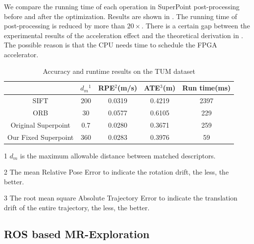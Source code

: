 We compare the running time of each operation in SuperPoint post-processing before and after the optimization. Results are shown in . The running time of post-processing is reduced by more than $20\times$. There is a certain gap between the experimental results of the acceleration effect and the theoretical derivation in . The possible reason is that the CPU needs time to schedule the FPGA accelerator.

\begin{table}[t]
  \centering
  \setlength{\abovecaptionskip}{2pt} 
  \caption{ Accuracy and runtime results on the TUM\cite{sturm12iros} dataset  }
  \footnotesize
  \begin{threeparttable}
\begin{tabular}{|c|c|c|c|c|} 
  \hline
        & $d_m$$^1$ & RPE$^2$(m/s) & ATE$^3$(m)  & Run time(ms) \bigstrut\\
  \hline
  SIFT \cite{Lowe-478}  & 200   & 0.0319  & 0.4219 & 2397  \bigstrut\\
  \hline
  ORB \cite{Mur-Artal:2017281}  & 30    & 0.0577  & 0.6105 & 229  \bigstrut\\
  \hline
  Original Superpoint \cite{detone2018superpoint} & 0.7   & 0.0280  & 0.3671 & 259  \bigstrut\\
  \hline
  Our Fixed Superpoint  & 360   & 0.0283  & 0.3976 & 59  \bigstrut\\
  \hline
  \end{tabular}%
  

\begin{tablenotes}
  \item[1] $d_m$ is the maximum allowable distance between matched descriptors.  
  \item[2] The mean Relative Pose Error to indicate the rotation drift, the less, the better.
  \item[3] The root mean square Absolute Trajectory Error to indicate the translation drift of the entire trajectory, the less, the better.
\end{tablenotes}
    \end{threeparttable}
  \label{tab:VO}%
\end{table}%

\subsection{ ROS based MR-Exploration }

